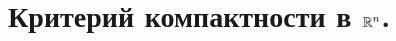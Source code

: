 \documentclass[../main.tex]{subfiles}
\begin{document}
\newpage
\section{Критерий компактности в \( \mathbb{R} ^n\).}
\end{document}
